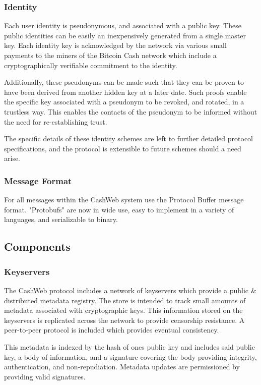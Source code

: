 \documentclass{article}
\begin{document}
\subsubsection{Identity}

Each user identity is pseudonymous, and associated with a public key. These public identities can be easily an inexpensively generated from a single master key. Each identity key is acknowledged by the network via various small payments to the miners of the Bitcoin Cash network which include a cryptographically verifiable commitment to the identity.

Additionally, these pseudonyms can be made such that they can be proven to have been derived from another hidden key at a later date. Such proofs enable the specific key associated with a pseudonym to be revoked, and rotated, in a trustless way. This enables the contacts of the pseudonym to be informed without the need for re-establishing trust.

The specific details of these identity schemes are left to further detailed protocol specifications, and the protocol is extensible to future schemes should a need arise.

\subsubsection{Message Format}

For all messages within the CashWeb system use the Protocol Buffer message format. "Protobufs" are now in wide use, easy to implement in a variety of languages, and serializable to binary.

\subsection{Components}

\subsubsection{Keyservers}

The CashWeb protocol includes a network of keyservers which provide a public \& distributed metadata registry. The store is intended to track small amounts of metadata associated with cryptographic keys. This information stored on the keyservers is replicated across the network to provide censorship resistance. A peer-to-peer protocol is included which provides eventual consistency.

This metadata is indexed by the hash of ones public key and includes said public key, a body of information, and a signature covering the body providing integrity, authentication, and non-repudiation. Metadata updates are permissioned by providing valid signatures.
\end{document}
